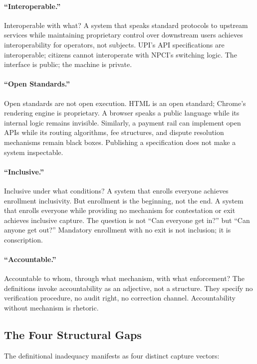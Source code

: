 \documentclass{article}
\begin{document}
\paragraph{``Interoperable.''}  Interoperable with what? A system that speaks standard protocols to upstream services while maintaining proprietary control over downstream users achieves interoperability for operators, not subjects. UPI's API specifications are interoperable; citizens cannot interoperate with NPCI's switching logic. The interface is public; the machine is private.

\paragraph{``Open Standards.''}  Open standards are not open execution. HTML is an open standard; Chrome's rendering engine is proprietary. A browser speaks a public language while its internal logic remains invisible. Similarly, a payment rail can implement open APIs while its routing algorithms, fee structures, and dispute resolution mechanisms remain black boxes. Publishing a specification does not make a system inspectable.

\paragraph{``Inclusive.''}  Inclusive under what conditions? A system that enrolls everyone achieves enrollment inclusivity. But enrollment is the beginning, not the end. A system that enrolls everyone while providing no mechanism for contestation or exit achieves inclusive capture. The question is not ``Can everyone get in?'' but ``Can anyone get out?'' Mandatory enrollment with no exit is not inclusion; it is conscription.

\paragraph{``Accountable.''}  Accountable to whom, through what mechanism, with what enforcement? The definitions invoke accountability as an adjective, not a structure. They specify no verification procedure, no audit right, no correction channel. Accountability without mechanism is rhetoric.

\subsection{The Four Structural Gaps}

The definitional inadequacy manifests as four distinct capture vectors:
\end{document}
